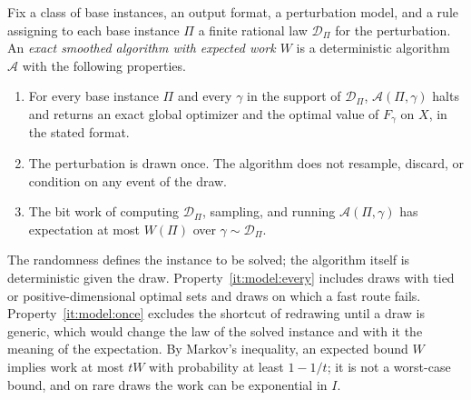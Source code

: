 \begin{definition}\label{def:model:algorithm}
Fix a class of base instances, an output format, a perturbation model, and a
rule assigning to each base instance $\Pi$ a finite rational law
$\mathcal D_\Pi$ for the perturbation. An \emph{exact smoothed algorithm with
expected work $W$} is a deterministic algorithm $\mathcal A$ with the
following properties.
\begin{enumerate}[label=(\roman*)]
\item\label{it:model:every} For every base instance $\Pi$ and every $\gamma$
in the support of $\mathcal D_\Pi$, $\mathcal A(\Pi,\gamma)$ halts and
returns an exact global optimizer and the optimal value of $F_\gamma$ on $X$,
in the stated format.
\item\label{it:model:once} The perturbation is drawn once. The algorithm
does not resample, discard, or condition on any event of the draw.
\item\label{it:model:expect} The bit work of computing $\mathcal D_\Pi$,
sampling, and running $\mathcal A(\Pi,\gamma)$ has expectation at most
$W(\Pi)$ over $\gamma\sim\mathcal D_\Pi$.
\end{enumerate}
\end{definition}

The randomness defines the instance to be solved; the algorithm itself is
deterministic given the draw. Property~\ref{it:model:every} includes draws
with tied or positive-dimensional optimal sets and draws on which a fast
route fails. Property~\ref{it:model:once} excludes the shortcut of redrawing
until a draw is generic, which would change the law of the solved instance
and with it the meaning of the expectation. By Markov's inequality, an
expected bound $W$ implies work at most $tW$ with probability at least
$1-1/t$; it is not a worst-case bound, and on rare draws the work can be
exponential in $I$.

